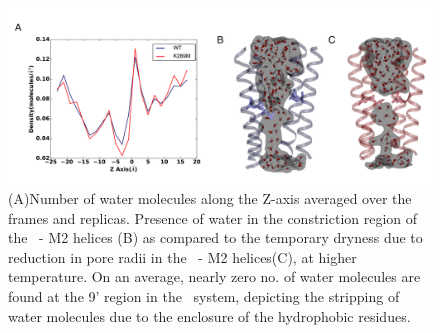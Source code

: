 \documentclass[9pt,twocolumn,twoside,lineno]{pnas-new}
\begin{document}
\begin{figure}
\begin{center}
\includegraphics[width = .5\textwidth]{figures/water_pore.pdf}
\end{center}
\caption{(A)Number of water molecules along the Z-axis averaged over the frames and replicas. Presence of water in the constriction region of the \WT\ - M2 helices (B) as compared to the temporary dryness due to reduction in pore radii in the  \MT\ - M2 helices(C), at higher temperature. On an average, nearly zero no. of water molecules are found at the 9' region in the \MT\ system, depicting the stripping of water molecules due to the enclosure of the hydrophobic residues.}
\label{fig:pore_water}
\end{figure}
\end{document}
